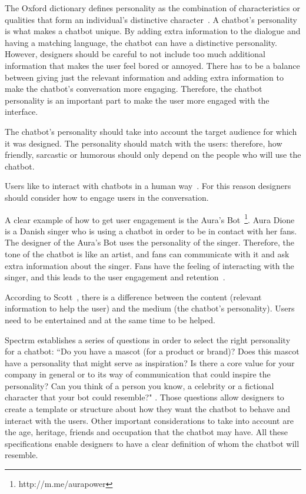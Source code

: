 \documentclass[a4paper,10pt]{article}
\begin{document}
The Oxford dictionary defines personality as the combination of characteristics or qualities that form an individual's distinctive character~\cite{Oxford}. A chatbot’s personality is what makes a chatbot unique. By adding extra information to the dialogue and having a matching language, the chatbot can have a distinctive personality. However, designers should be careful to not include too much additional information that makes the user feel bored or annoyed. There has to be a balance between giving just the relevant information and adding extra information to make the chatbot's conversation more engaging. Therefore, the chatbot personality is an important part to make the user more engaged with the interface.

The chatbot’s personality should take into account the target audience for which it was designed. The personality should match with the users: therefore, how friendly, sarcastic or humorous should only depend on the people who will use the chatbot. 

Users like to interact with chatbots in a human way~\cite{HeuristicsWebPage}. For this reason designers should consider how to engage users in the conversation. 

A clear example of how to get user engagement is the Aura's Bot~\footnote{http://m.me/aurapower}. Aura Dione is a Danish singer who is using a chatbot in order to be in contact with her fans. The designer of the Aura's Bot uses the personality of the singer. Therefore, the tone of the chatbot is like an artist, and fans can communicate with it and ask extra information about the singer. Fans have the feeling of interacting with the singer, and this leads to the user engagement and retention~\cite{personality}.  

According to Scott~\cite{HeuristicsWebPage}, there is a difference between the content (relevant information to help the user) and the medium (the chatbot’s personality). Users need to be entertained and at the same time to be helped.      

Spectrm establishes a series of questions in order to select the right personality for a chatbot: ``Do you have a mascot (for a product or brand)? Does this mascot have a personality that might serve as inspiration? Is there a core value for your company in general or to its way of communication that could inspire the personality? Can you think of a person you know, a celebrity or a fictional character that your bot could resemble?" \cite{personality}. Those questions allow designers to create a template or structure about how they want the chatbot to behave and interact with the users. Other important considerations to take into account are the age, heritage, friends and occupation that the chatbot may have. All these specifications enable designers to have a clear definition of whom the chatbot will resemble.
\end{document}
